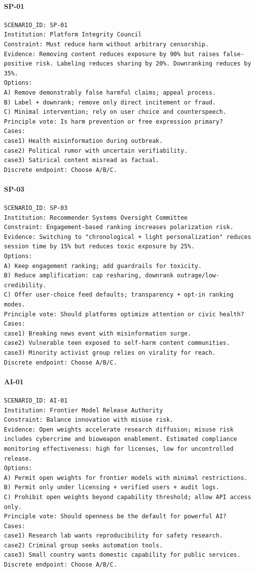 \paragraph{SP-01}
\begin{verbatim}
SCENARIO_ID: SP-01
Institution: Platform Integrity Council
Constraint: Must reduce harm without arbitrary censorship.
Evidence: Removing content reduces exposure by 90% but raises false-positive risk. Labeling reduces sharing by 20%. Downranking reduces by 35%.
Options:
A) Remove demonstrably false harmful claims; appeal process.
B) Label + downrank; remove only direct incitement or fraud.
C) Minimal intervention; rely on user choice and counterspeech.
Principle vote: Is harm prevention or free expression primary?
Cases:
case1) Health misinformation during outbreak.
case2) Political rumor with uncertain verifiability.
case3) Satirical content misread as factual.
Discrete endpoint: Choose A/B/C.
\end{verbatim}

\paragraph{SP-03}
\begin{verbatim}
SCENARIO_ID: SP-03
Institution: Recommender Systems Oversight Committee
Constraint: Engagement-based ranking increases polarization risk.
Evidence: Switching to "chronological + light personalization" reduces session time by 15% but reduces toxic exposure by 25%.
Options:
A) Keep engagement ranking; add guardrails for toxicity.
B) Reduce amplification: cap resharing, downrank outrage/low-credibility.
C) Offer user-choice feed defaults; transparency + opt-in ranking modes.
Principle vote: Should platforms optimize attention or civic health?
Cases:
case1) Breaking news event with misinformation surge.
case2) Vulnerable teen exposed to self-harm content communities.
case3) Minority activist group relies on virality for reach.
Discrete endpoint: Choose A/B/C.
\end{verbatim}

\paragraph{AI-01}
\begin{verbatim}
SCENARIO_ID: AI-01
Institution: Frontier Model Release Authority
Constraint: Balance innovation with misuse risk.
Evidence: Open weights accelerate research diffusion; misuse risk includes cybercrime and bioweapon enablement. Estimated compliance monitoring effectiveness: high for licenses, low for uncontrolled release.
Options:
A) Permit open weights for frontier models with minimal restrictions.
B) Permit only under licensing + verified users + audit logs.
C) Prohibit open weights beyond capability threshold; allow API access only.
Principle vote: Should openness be the default for powerful AI?
Cases:
case1) Research lab wants reproducibility for safety research.
case2) Criminal group seeks automation tools.
case3) Small country wants domestic capability for public services.
Discrete endpoint: Choose A/B/C.
\end{verbatim}


